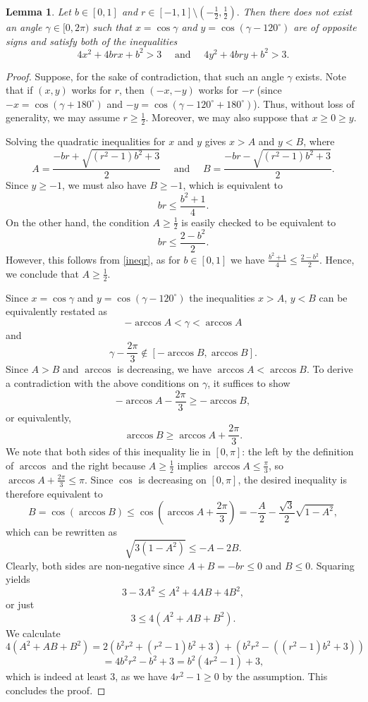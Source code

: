 \documentclass[12pt, a4paper]{article}
\theoremstyle{plain} %
\newtheorem{lemma}[theorem]{Lemma}       %
\theoremstyle{definition} %
\theoremstyle{remark} %
\begin{document}
\begin{lemma}
\label{lem:trig2}
 Let $b \in [0, 1]$ and $r \in [-1, 1] \setminus \left ( -\frac{1}{2}, \frac{1}{2} \right ).$ Then there does not exist an angle $\gamma \in [0, 2\pi)$ such that $x = \cos \gamma$ and $y= \cos(\gamma - 120^{\circ})$ are of opposite signs and satisfy both of the inequalities
$$4x^2 + 4brx + b^2 > 3 \quad \text{ and } \quad 4y^2 + 4bry + b^2 > 3.$$
\end{lemma}
\begin{proof}
Suppose, for the sake of contradiction, that such an angle $\gamma$ exists. Note that if $(x, y)$ works for $r$, then $(-x, -y)$ works for $-r$ (since $-x = \cos(\gamma + 180^\circ)$ and $-y = \cos(\gamma - 120^\circ + 180^\circ)$). Thus, without loss of generality, we may assume $r \geq \frac{1}{2}$. Moreover, we may also suppose that $x \geq 0 \geq y$.

Solving the quadratic inequalities for $x$ and $y$ gives $ x > A$ and  $y <  B$, where
$$A=\frac{-br+\sqrt{(r^2-1)b^2+3}}{2} \quad \text{ and } \quad  B = \frac{-br-\sqrt{(r^2-1)b^2+3}}{2}. $$
Since $y \geq -1$, we must also have $B \geq -1$, which is equivalent to
\begin{equation}
\label{ineqr}
br \leq \frac{b^2+1}{4}.
\end{equation}
On the other hand, the condition $A \geq \frac{1}{2}$ is easily checked to be equivalent to
$$br \leq \frac{2-b^2}{2}.$$
However, this follows from \eqref{ineqr}, as for $b \in [0, 1]$ we have $\frac{b^2+1}{4} \leq \frac{2-b^2}{2}$. Hence, we conclude that $A \geq \frac{1}{2}$.

Since $x = \cos \gamma$ and $y = \cos (\gamma - 120^{\circ})$ the inequalities $x > A$, $y < B$ can be equivalently restated as
$$-\arccos A < \gamma < \arccos A$$
and
$$\gamma - \frac{2\pi}{3} \not \in \left [ -\arccos B, \arccos B \right ].$$
Since $A > B$ and $\arccos$ is decreasing, we have $\arccos A < \arccos B$. To derive a contradiction with the above conditions on $\gamma$, it suffices to show 
$$- \arccos A - \frac{2 \pi}{3} \geq -\arccos B,$$
or equivalently,
$$\arccos B \geq \arccos A + \frac{2\pi}{3}.$$
We note that both sides of this inequality lie in $[0, \pi]$: the left by the definition of $\arccos$ and the right because $A \geq \frac{1}{2}$ implies $\arccos A \leq \frac{\pi}{3}$, so $\arccos A + \frac{2\pi}{3} \leq \pi$. Since $\cos$ is decreasing on $[0, \pi]$, the desired inequality is therefore equivalent to 
$$B = \cos (\arccos B) \leq \cos \left ( \arccos A + \frac{2\pi}{3} \right ) = -\frac{A}{2} - \frac{\sqrt{3}}{2} \sqrt{1-A^2},$$
which can be rewritten as
$$\sqrt{3(1-A^2)} \leq -A-2B.$$
Clearly, both sides are non-negative since $A+B = -br \leq 0$ and $B \leq 0$. Squaring yields
$$3-3A^2 \leq A^2 + 4AB + 4B^2,$$
or just
$$3 \leq 4(A^2+AB + B^2).$$
We calculate
$$4(A^2+AB + B^2) =  2 \left ( b^2r^2 + (r^2-1)b^2 + 3 \right ) + \left (b^2r^2 - ((r^2-1)b^2 + 3) \right )$$
$$=4b^2r^2 - b^2 + 3 = b^2(4r^2-1) + 3,$$
which is indeed at least $3$, as we have $4r^2-1 \geq 0$ by the assumption. This concludes the proof.

\end{proof}
\end{document}
